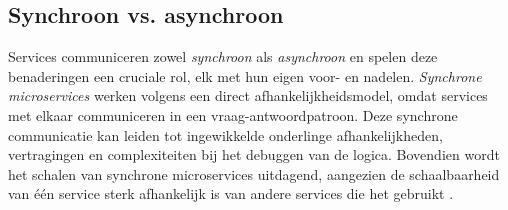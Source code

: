 


 
\subsection{Synchroon vs. asynchroon}
Services communiceren zowel \emph{synchroon} als \emph{asynchroon} en spelen deze benaderingen een cruciale rol, 
elk met hun eigen voor- en nadelen. \emph{Synchrone microservices} werken volgens een direct 
afhankelijkheidsmodel, omdat services met elkaar communiceren in een vraag-antwoordpatroon. 
Deze synchrone communicatie kan leiden tot ingewikkelde onderlinge afhankelijkheden, vertragingen en complexiteiten bij het debuggen 
van de logica. Bovendien wordt het schalen van synchrone microservices uitdagend, 
aangezien de schaalbaarheid van één service sterk afhankelijk is van andere services die het gebruikt \autocite{Bellemare2020}. 
\newline

